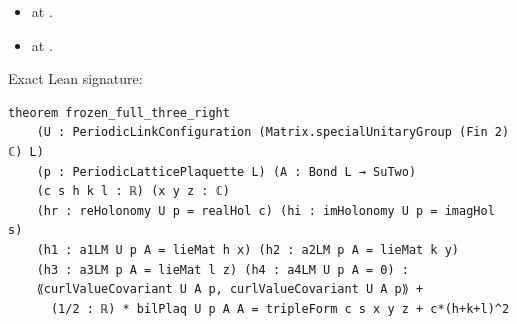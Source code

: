 \begin{theorem}[bp-207]
\begin{itemize}
\item \texttt{} at \texttt{}.
\item \texttt{} at \texttt{}.
\end{itemize}
\par Exact Lean signature:
\begin{verbatim}
theorem frozen_full_three_right
    (U : PeriodicLinkConfiguration (Matrix.specialUnitaryGroup (Fin 2) ℂ) L)
    (p : PeriodicLatticePlaquette L) (A : Bond L → SuTwo)
    (c s h k l : ℝ) (x y z : ℂ)
    (hr : reHolonomy U p = realHol c) (hi : imHolonomy U p = imagHol s)
    (h1 : a1LM U p A = lieMat h x) (h2 : a2LM p A = lieMat k y)
    (h3 : a3LM p A = lieMat l z) (h4 : a4LM U p A = 0) :
    ⟪curlValueCovariant U A p, curlValueCovariant U A p⟫ +
      (1/2 : ℝ) * bilPlaq U p A A = tripleForm c s x y z + c*(h+k+l)^2
\end{verbatim}
\end{theorem}

